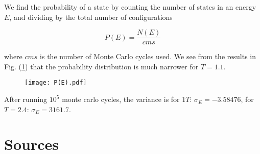 \documentclass[11pt]{article}
\begin{document}
\begin{flushleft}
We find the probability of a state by counting the number of states in an energy $E$, and dividing by the total number of configurations

\begin{equation}
P(E) = \frac{N(E)}{cms}
\end{equation}

where $cms$ is the number of Monte Carlo cycles used. We see from the results in Fig. (\ref{fig::P(E)}) that the probability distribution is much narrower for $T=1.1$.

\begin{figure}
\centering
\texttt{[image: P(E).pdf]}
\label{fig::P(E)}
\end{figure}

After running $10^5$ monte carlo cycles, the variance is for $1T$: $ \sigma_E = -3.58476$, for $T=2.4$: $\sigma_E = 3161.7$.

\end{flushleft}


\section{Sources}
\end{document}
